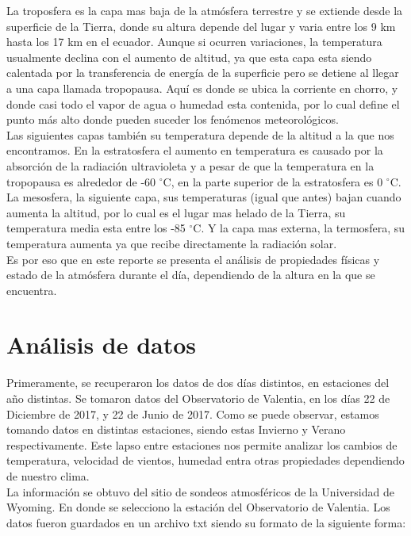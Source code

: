 \documentclass[12pt]{article}
\begin{document}
La troposfera es la capa mas baja de la atmósfera terrestre y se extiende desde la superficie de la Tierra, donde su altura depende del lugar y varia entre los 9 km hasta los 17 km en el ecuador. Aunque si ocurren variaciones, la temperatura usualmente declina con el aumento de altitud, ya que esta capa esta siendo calentada por la transferencia de energía de la superficie pero se detiene al llegar a una capa llamada tropopausa. Aquí es donde se ubica la corriente en chorro, y donde casi todo el vapor de agua o humedad esta contenida, por lo cual define el punto más alto donde pueden suceder los fenómenos meteorológicos. \\

Las siguientes capas también su temperatura depende de la altitud a la que nos encontramos. En la estratosfera el aumento en temperatura es causado por la absorción de la radiación ultravioleta y a pesar de que la temperatura en la tropopausa es alrededor de -60 $^{\circ}$C, en la parte superior de la estratosfera es 0 $^{\circ}$C. La mesosfera, la siguiente capa, sus temperaturas (igual que antes) bajan cuando aumenta la altitud, por lo cual es el lugar mas helado de la Tierra, su temperatura media esta entre los -85 $^{\circ}$C. Y la capa mas externa, la termosfera, su temperatura aumenta ya que recibe directamente la radiación solar. \\ 

Es por eso que en este reporte se presenta el análisis de propiedades físicas y estado de la atmósfera durante el día, dependiendo de la altura en la que se encuentra. 

\section{Análisis de datos}
Primeramente, se recuperaron los datos de dos días distintos, en estaciones del año distintas. Se tomaron datos del Observatorio de Valentia, en los días 22 de Diciembre de 2017, y 22 de Junio de 2017. Como se puede observar, estamos tomando datos en distintas estaciones, siendo estas Invierno y Verano respectivamente. Este lapso entre estaciones nos permite analizar los cambios de temperatura, velocidad de vientos, humedad entra otras propiedades dependiendo de nuestro clima. \\

La información se obtuvo del sitio de sondeos atmosféricos de la Universidad de Wyoming. En donde se selecciono la estación del Observatorio de Valentia. Los datos fueron guardados en un archivo txt siendo su formato de la siguiente forma:
\end{document}
